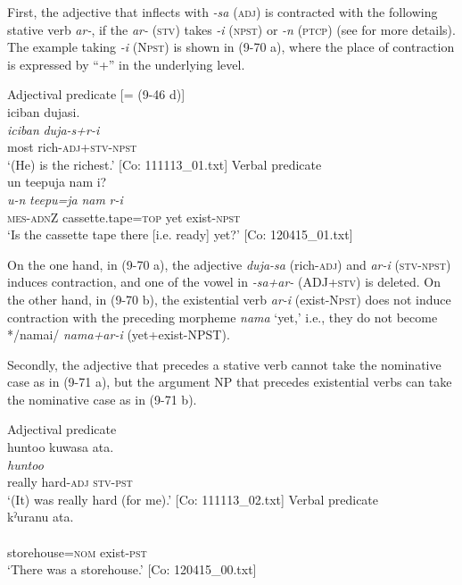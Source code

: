 First, the adjective that inflects with \textit{{}-sa} (\textsc{adj}) is contracted with the following stative verb \textit{ar-}, if the \textit{ar-} (\textsc{stv}) takes \textit{{}-i} (\textsc{npst}) or \textit{-n} (\textsc{ptcp}) (see  for more details). The example taking \textit{{}-i} (N\textsc{pst}) is shown in (9-70 a), where the place of contraction is expressed by “+” in the underlying level.

\ea   \label{ex:9.70}
\ea Adjectival predicate [= (9-46 d)]\\
    \glll  {\textbar}iciban{\textbar}  dujasi.\\
      \textit{iciban}  \textit{duja-s+r-i}\\
      most  rich-\textsc{adj}+\textsc{stv}-\textsc{npst}\\
      \glt       ‘(He) is the richest.’ [Co: 111113\_01.txt]
\ex Verbal predicate\\
    \glll  un  {\textbar}teepu{\textbar}ja  nam  i?\\
      \textit{u-n}  \textit{teepu=ja}  \textit{nam}  \textit{r-i}\\
      \textsc{mes}-\textsc{adn}Z  cassette.tape=\textsc{top}  yet  exist-\textsc{npst}\\
      \glt       ‘Is the cassette tape there [i.e. ready] yet?’ [Co: 120415\_01.txt]
    \z
\z

On the one hand, in (9-70 a), the adjective \textit{duja-sa} (rich-\textsc{adj}) and \textit{ar-i} (\textsc{stv}-\textsc{npst}) induces contraction, and one of the vowel in \textit{{}-sa+ar-} (ADJ+\textsc{stv}) is deleted. On the other hand, in (9-70 b), the existential verb \textit{ar-i} (exist-N\textsc{pst}) does not induce contraction with the preceding morpheme \textit{nama} ‘yet,’ i.e., they do not become */namai/ \textit{nama+ar-i} (yet+exist-NPST).

Secondly, the adjective that precedes a stative verb cannot take the nominative case as in (9-71 a), but the argument NP that precedes existential verbs can take the nominative case as in (9-71 b).

\ea    \label{ex:9.71}
 \ea Adjectival predicate\\
    \glll  huntoo  kuwasa  ata.\\
      \textit{huntoo}  \textit{}  \textit{}\\
      really  hard-\textsc{adj}  \textsc{stv}-\textsc{pst}\\
      \glt       ‘(It) was really hard (for me).’ [Co: 111113\_02.txt]
 \ex Verbal predicate\\
    \glll  kˀuranu  ata.\\
      \textit{}  \textit{}\\
      storehouse=\textsc{nom}  exist-\textsc{pst}\\
      \glt       ‘There was a storehouse.’ [Co: 120415\_00.txt]
    \z
\z

